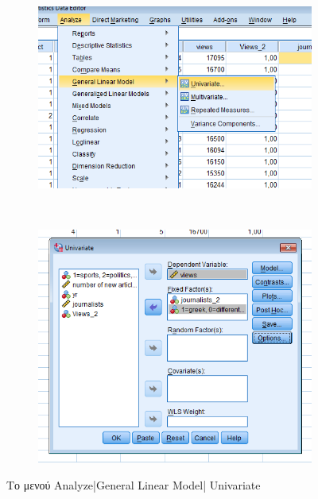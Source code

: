 \documentclass{assignment}
\begin{document}
\begin{Assignment}[Μέρος Δ]
\begin{figure}[htbp]
  \centering
  \begin{subfigure}[b]{0.5\textwidth}
     \includegraphics[width=\textwidth,height=0.25\textheight]{images/menu_univariate.png}
  \end{subfigure}%
   ~ %
  \begin{subfigure}[b]{0.5\textwidth}
    \includegraphics[width=\textwidth,height=0.25\textheight]{images/univariate.png}
  \end{subfigure}
  \caption{Το μενού Analyze|General Linear Model| Univariate}
\label{fig:univariate}
\end{figure}



\end{Assignment}
\end{document}
